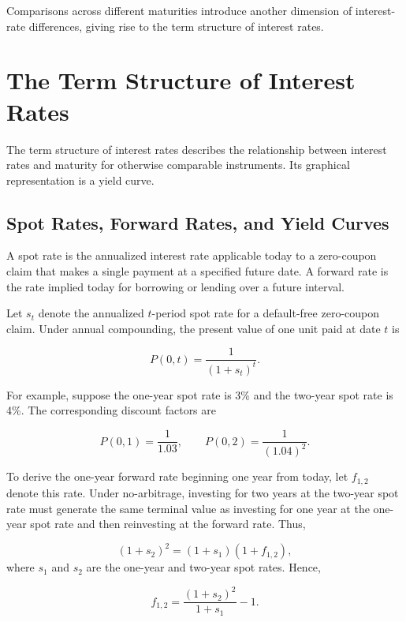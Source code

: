 Comparisons across different maturities introduce another
dimension of interest-rate differences, giving rise to
the term structure of interest rates.

\section{The Term Structure of Interest Rates}

The term structure of interest rates describes the relationship between interest rates and maturity for otherwise comparable instruments. Its graphical representation is a yield curve.

\subsection{Spot Rates, Forward Rates, and Yield Curves}

A spot rate is the annualized interest rate applicable today
to a zero-coupon claim that makes a single payment at a
specified future date. A forward rate is the rate implied
today for borrowing or lending over a future interval.

Let $s_t$ denote the annualized $t$-period spot rate for
a default-free zero-coupon claim. Under annual compounding,
the present value of one unit paid at date $t$ is

\begin{equation}
P(0,t)=\frac{1}{(1+s_t)^t}.
\label{eq:ch6-spot-discount-factor}
\end{equation}

For example, suppose the one-year spot rate is 3\% and
the two-year spot rate is 4\%. The corresponding discount
factors are

\[
P(0,1)=\frac{1}{1.03},
\qquad
P(0,2)=\frac{1}{(1.04)^2}.
\]

To derive the one-year forward rate beginning one year
from today, let $f_{1,2}$ denote this rate. Under
no-arbitrage, investing for two years at the two-year
spot rate must generate the same terminal value as
investing for one year at the one-year spot rate and
then reinvesting at the forward rate. Thus,

\begin{equation}
(1+s_2)^2
=
(1+s_1)(1+f_{1,2}),
\label{eq:ch6-forward-from-spot}
\end{equation}
where $s_1$ and $s_2$ are the one-year and two-year
spot rates. Hence,

\begin{equation}
f_{1,2}
=
\frac{(1+s_2)^2}{1+s_1}-1.
\label{eq:ch6-forward-rate}
\end{equation}

